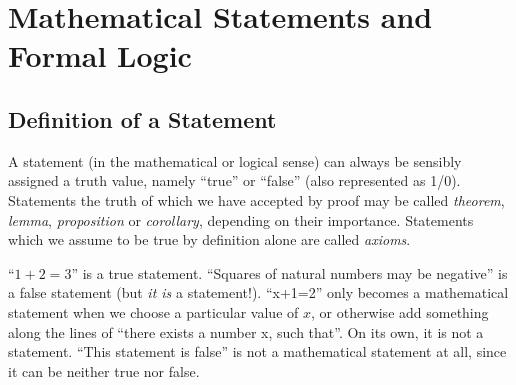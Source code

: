 \chapter{Mathematical Statements and Formal Logic}\label{ch:statements}
\section{Definition of a Statement}

\begin{definition}
  A statement (in the mathematical or logical sense) can always be sensibly
  assigned a truth value, namely ``true'' or ``false'' (also represented as 1/0).
  Statements the truth of which we have accepted by proof may be called
  \emph{theorem}, \emph{lemma}, \emph{proposition} or \emph{corollary},
  depending on their importance.
  Statements which we assume to be true by definition alone are called
  \emph{axioms}.
\end{definition}

\begin{example}
  \begin{itemize}
    \leavevmode
    \ii{} ``\(1+2=3\)'' is a true statement.
    \ii{} ``Squares of natural numbers may be negative'' is a false statement
          (but \emph{it is} a statement!).
    \ii{} ``x+1=2'' only becomes a mathematical statement when we choose a
          particular value of \(x\), or otherwise add something along the lines
          of ``there exists a number x, such that''. On its own, it is
          not a statement.
   \ii{} ``This statement is false'' is not a mathematical statement at all,
          since it can be neither true nor false.
  \end{itemize}
\end{example}

